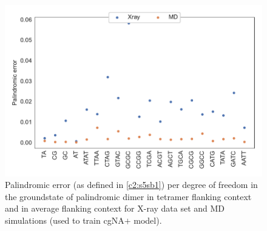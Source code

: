 

\begin{figure}[H]
	\begin{center}
	\includegraphics[scale=0.8]{./Xray_images/palin_err_tt3_3S_C1_cg_unsym.pdf}
	\caption{
    Palindromic error (as defined in \cref{c2:s5sb1}) per degree of freedom in the groundstate of palindromic dimer in tetramer flanking context and in average flanking context for X-ray data set and MD simulations (used to train cgNA$+$ model). 
	}
\label{SIfig:palin_error}
\end{center}
\end{figure}



